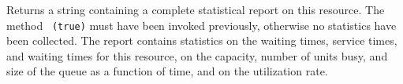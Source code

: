 \begin{tabb}  Returns a string containing a complete statistical report on this 
  resource.  The method ~\texttt{(true)} must have been invoked 
  previously, otherwise no statistics have been collected.
  The report contains statistics on the waiting times, service
  times, and waiting times for this resource, on the capacity,
  number of units busy, and size of the queue as a function of time,
  and on the utilization rate.
\end{tabb}
\begin{htmlonly}
\end{htmlonly}
